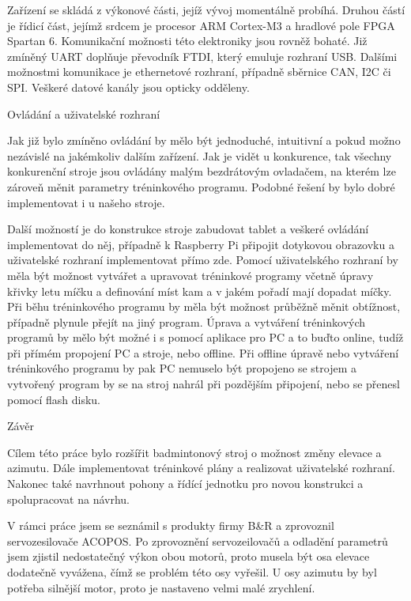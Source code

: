 Zařízení se skládá z výkonové části, jejíž vývoj momentálně probíhá. Druhou částí je řídicí část, jejímž srdcem je procesor ARM Cortex-M3 a hradlové pole FPGA Spartan 6. Komunikační možnosti této elektroniky jsou rovněž bohaté. Již zmíněný UART doplňuje převodník FTDI, který emuluje rozhraní USB. Dalšími možnostmi komunikace je ethernetové rozhraní, případně sběrnice CAN, I2C či SPI. Veškeré datové kanály jsou opticky odděleny.

\secc Ovládání a uživatelské rozhraní

Jak již bylo zmíněno ovládání by mělo být jednoduché, intuitivní a pokud možno nezávislé na jakémkoliv dalším zařízení. Jak je vidět u konkurence, tak všechny konkurenční stroje jsou ovládány malým bezdrátovým ovladačem, na kterém lze zároveň měnit parametry tréninkového programu. Podobné řešení by bylo dobré implementovat i u našeho stroje. 

Další možností je do konstrukce stroje zabudovat tablet a veškeré ovládání implementovat do něj, případně k Raspberry Pi připojit dotykovou obrazovku a uživatelské rozhraní implementovat přímo zde.
\nl
\nl
Pomocí uživatelského rozhraní by měla být možnost vytvářet a upravovat tréninkové programy včetně úpravy křivky letu míčku a definování míst kam a v jakém pořadí mají dopadat míčky. Při běhu tréninkového programu by měla být možnost průběžně měnit obtížnost, případně plynule přejít na jiný program. 
\nl
\nl
Úprava a vytváření tréninkových programů by mělo být možné i s pomocí aplikace pro PC a to buďto online, tudíž při přímém propojení PC a stroje, nebo offline. Při offline úpravě nebo vytváření tréninkového programu by pak PC nemuselo být propojeno se strojem a vytvořený program by se na stroj nahrál při pozdějším připojení, nebo se přenesl pomocí flash disku. 


\chap Závěr

Cílem této práce bylo rozšířit badmintonový stroj o možnost změny elevace a azimutu. Dále implementovat tréninkové plány a realizovat uživatelské rozhraní. Nakonec také navrhnout pohony a řídící jednotku pro novou konstrukci a spolupracovat na návrhu.

V rámci práce jsem se seznámil s produkty firmy B\&R a zprovoznil servozesilovače ACOPOS. Po zprovoznění servozeilovačů a odladění parametrů jsem zjistil nedostatečný výkon obou motorů, proto musela být osa elevace dodatečně vyvážena, čímž se problém této osy vyřešil. U osy azimutu by byl potřeba silnější motor, proto je nastaveno velmi malé zrychlení. 

